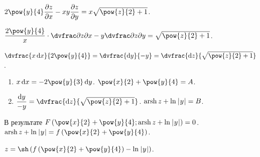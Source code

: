 \documentclass[a5paper,10pt]{article}
\begin{document}
    $2\pow{y}{4} \parder{z} {x} - xy \parder{z} {y} = x \sqrt{\pow{z}{2} + 1}$.
    
    $\dfrac {2\pow{y}{4}} {x} \cdot \vparder{z} {x} - y \vparder{z} {y} = \sqrt{\pow{z}{2} + 1}$.
        
    $\dvfrac {x \di x} {2\pow{y}{4}}
    = \dvfrac {\di y} {-y}
    = \dvfrac {\di z} {\sqrt{\pow{z}{2} + 1}}$.
    
    \begin{enumerate}
        \item $x \di x = -2\pow{y}{3} \di y$.
        $\pow{x}{2} + \pow{y}{4} = A$.
        
        \item $\dfrac {\di y} {-y} = \dvfrac {\di z} {\sqrt{\pow{z}{2} + 1}}$.
        $\operatorname{arsh}{z} + \ln\hspace{0.2mm}\left|\hspace{0.06em}y\hspace{0.06em}\right| = B$.
    \end{enumerate}
    
    В результате $F\br{\pow{x}{2} + \pow{y}{4}; \arsh z + \ln\vbr{y}} = 0$.
    $\arsh z + \ln\vbr{y} = f\br{\pow{x}{2} + \pow{y}{4}}$.
    
    $z = \sh\br{f\br{\pow{x}{2} + \pow{y}{4}} - \ln\vbr{y}}$.
\end{document}
